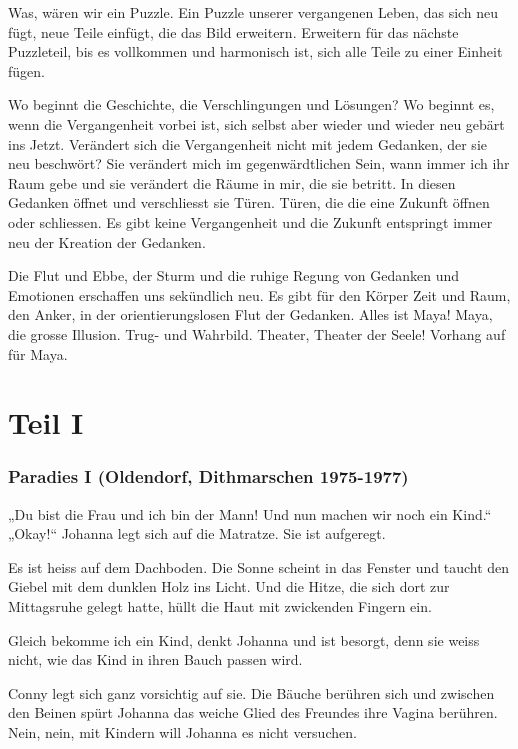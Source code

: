 \documentclass[10pt,a5paper]{book}
\begin{document}
Was, wären wir ein Puzzle. Ein Puzzle unserer vergangenen Leben, das sich neu fügt, neue Teile einfügt, die das Bild erweitern. Erweitern für das nächste Puzzleteil, bis es vollkommen und harmonisch ist, sich alle Teile zu einer Einheit fügen.

Wo beginnt die Geschichte, die Verschlingungen und Lösungen? Wo beginnt es, wenn die Vergangenheit vorbei ist, sich selbst aber wieder und wieder neu gebärt ins Jetzt. Verändert sich die Vergangenheit nicht mit jedem Gedanken, der sie neu beschwört? Sie verändert mich im gegenwärdtlichen Sein, wann immer ich ihr Raum gebe und sie verändert die Räume in mir, die sie betritt. In diesen Gedanken öffnet und verschliesst sie Türen. Türen, die die eine Zukunft öffnen oder schliessen. Es gibt keine Vergangenheit und die Zukunft entspringt immer neu der Kreation der Gedanken.

Die Flut und Ebbe, der Sturm und die ruhige Regung von Gedanken und Emotionen erschaffen uns sekündlich neu. Es gibt für den Körper Zeit und Raum, den Anker, in der orientierungslosen Flut der Gedanken. Alles ist Maya! Maya, die grosse Illusion. Trug- und Wahrbild. Theater, Theater der Seele!
Vorhang auf für Maya.



\part*{Teil I}


\section*{Paradies I (Oldendorf, Dithmarschen 1975-1977)}



„Du bist die Frau und ich bin der Mann! Und nun machen wir noch ein Kind.“ „Okay!“ Johanna legt sich auf die Matratze. Sie ist aufgeregt.

Es ist heiss auf dem Dachboden. Die Sonne scheint in das Fenster und taucht den Giebel mit dem dunklen Holz ins Licht. Und die Hitze, die sich dort zur Mittagsruhe gelegt hatte, hüllt die Haut mit zwickenden Fingern ein.

Gleich bekomme ich ein Kind, denkt Johanna und ist besorgt, denn sie weiss nicht, wie das Kind in ihren Bauch passen wird.

Conny legt sich ganz vorsichtig auf sie. Die Bäuche berühren sich und zwischen den Beinen spürt Johanna das weiche Glied des Freundes ihre Vagina berühren. Nein, nein, mit Kindern will Johanna es nicht versuchen.
\end{document}

